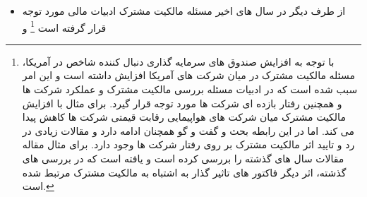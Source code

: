 \documentclass[12pt, a4paper]{article}
\begin{document}
\begin{itemize}
\item 
از طرف دیگر در سال های اخیر مسئله مالکیت مشترک ادبیات مالی مورد توجه قرار گرفته است
\footnote{
	با توجه به افزایش صندوق های سرمایه گذاری  دنبال کننده شاخص در آمریکا، مسئله مالکیت مشترک در میان شرکت های آمریکا افزایش داشته است و این امر سبب شده است که در ادبیات مسئله بررسی مالکیت مشترک و عملکرد شرکت ها و همچنین رفتار بازده ای شرکت ها مورد توجه قرار گیرد. 
	برای مثال 
	با افزایش مالکیت مشترک میان شرکت های هواپیمایی رقابت قیمتی شرکت ها کاهش پیدا می کند.  اما در این رابطه بحث و گفت و گو همچنان ادامه دارد و مقالات زیادی در رد و تایید اثر مالکیت مشترک بر روی رفتار شرکت ها وجود دارد. برای مثال مقاله
	مقالات سال های گذشته را بررسی کرده است و یافته است که در بررسی های گذشته، اثر دیگر فاکتور های تاثیر گذار به اشتباه به مالکیت مشترک مرتبط شده است.
}
 و
 

\end{itemize}
\end{document}
